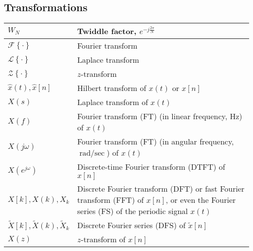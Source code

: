 \documentclass{article}
\begin{document}
\subsection{Transformations}
\begin{xltabular}{\textwidth}{XX}
	\(W_N\)                                     & Twiddle factor, \(e^{-j\frac{2\pi}{N}}\) \cite{ingleDigitalSignalProcessing2000}                                                              \\ \hline
	\(\mathcal{F}\left\{ \cdot \right\}\)       & Fourier transform                                                                                                                             \\ \hline
	\(\mathcal{L}\left\{ \cdot \right\}\)       & Laplace transform                                                                                                                             \\ \hline
	\(\mathcal{Z}\left\{ \cdot \right\}\)       & \(z\)-transform                                                                                                                               \\ \hline
	\(\hat{x}(t), \hat{x}[n]\)                  & Hilbert transform of \(x(t)\) or \(x[n]\)                                                                                                     \\ \hline
	\(X(s)\)                                    & Laplace transform of \(x(t)\)                                                                                                                 \\ \hline
	\(X(f)\)                                    & Fourier transform (FT) (in linear frequency, \(\unit{\Hz}\)) of \(x(t)\)                                                                      \\ \hline
	\(X(j\omega)\)                              & Fourier transform (FT) (in angular frequency, \(\unit{\radian\per\sec}\)) of \(x(t)\)                                                         \\ \hline
	\(X(e^{j\omega})\)                          & Discrete-time Fourier transform (DTFT) of \(x[n]\)                                                                                            \\ \hline
	\(X[k], X(k), X_k\)                         & Discrete Fourier transform (DFT) or fast Fourier transform (FFT) of \(x[n]\), or even the Fourier series (FS) of the periodic signal \(x(t)\) \\ \hline
	\(\tilde{X}[k], \tilde{X}(k), \tilde{X}_k\) & Discrete Fourier series (DFS) of \(\tilde{x}[n]\)                                                                                             \\ \hline
	\(X(z)\)                                    & \(z\)-transform of \(x[n]\)                                                                                                                   \\
\end{xltabular}
\end{document}
